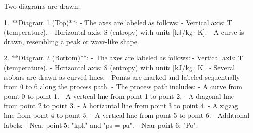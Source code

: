 Two diagrams are drawn:  

1. **Diagram 1 (Top)**:  
   - The axes are labeled as follows:  
     - Vertical axis: T (temperature).  
     - Horizontal axis: S (entropy) with units [kJ/kg·K].  
   - A curve is drawn, resembling a peak or wave-like shape.  

2. **Diagram 2 (Bottom)**:  
   - The axes are labeled as follows:  
     - Vertical axis: T (temperature).  
     - Horizontal axis: S (entropy) with units [kJ/kg·K].  
   - Several isobars are drawn as curved lines.  
   - Points are marked and labeled sequentially from 0 to 6 along the process path.  
   - The process path includes:  
     - A curve from point 0 to point 1.  
     - A vertical line from point 1 to point 2.  
     - A diagonal line from point 2 to point 3.  
     - A horizontal line from point 3 to point 4.  
     - A zigzag line from point 4 to point 5.  
     - A vertical line from point 5 to point 6.  
   - Additional labels:  
     - Near point 5: "kpk" and "ps = pu".  
     - Near point 6: "Po".
